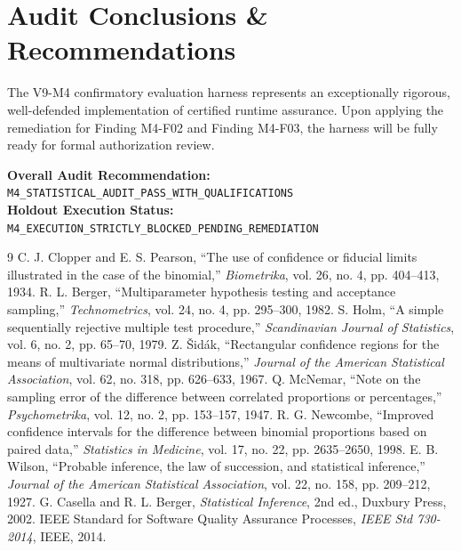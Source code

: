 \documentclass[10pt,a4paper]{article}
\begin{document}
\section{Audit Conclusions \& Recommendations}
The V9-M4 confirmatory evaluation harness represents an exceptionally rigorous, well-defended implementation of certified runtime assurance. Upon applying the remediation for Finding M4-F02 and Finding M4-F03, the harness will be fully ready for formal authorization review.

\noindent \textbf{Overall Audit Recommendation:} \texttt{M4\_STATISTICAL\_AUDIT\_PASS\_WITH\_QUALIFICATIONS}\\
\noindent \textbf{Holdout Execution Status:} \texttt{M4\_EXECUTION\_STRICTLY\_BLOCKED\_PENDING\_REMEDIATION}

\begin{thebibliography}{9}
 C. J. Clopper and E. S. Pearson, ``The use of confidence or fiducial limits illustrated in the case of the binomial,'' \textit{Biometrika}, vol. 26, no. 4, pp. 404--413, 1934.
 R. L. Berger, ``Multiparameter hypothesis testing and acceptance sampling,'' \textit{Technometrics}, vol. 24, no. 4, pp. 295--300, 1982.
 S. Holm, ``A simple sequentially rejective multiple test procedure,'' \textit{Scandinavian Journal of Statistics}, vol. 6, no. 2, pp. 65--70, 1979.
 Z. Šidák, ``Rectangular confidence regions for the means of multivariate normal distributions,'' \textit{Journal of the American Statistical Association}, vol. 62, no. 318, pp. 626--633, 1967.
 Q. McNemar, ``Note on the sampling error of the difference between correlated proportions or percentages,'' \textit{Psychometrika}, vol. 12, no. 2, pp. 153--157, 1947.
 R. G. Newcombe, ``Improved confidence intervals for the difference between binomial proportions based on paired data,'' \textit{Statistics in Medicine}, vol. 17, no. 22, pp. 2635--2650, 1998.
 E. B. Wilson, ``Probable inference, the law of succession, and statistical inference,'' \textit{Journal of the American Statistical Association}, vol. 22, no. 158, pp. 209--212, 1927.
 G. Casella and R. L. Berger, \textit{Statistical Inference}, 2nd ed., Duxbury Press, 2002.
 IEEE Standard for Software Quality Assurance Processes, \textit{IEEE Std 730-2014}, IEEE, 2014.
\end{thebibliography}
\end{document}
